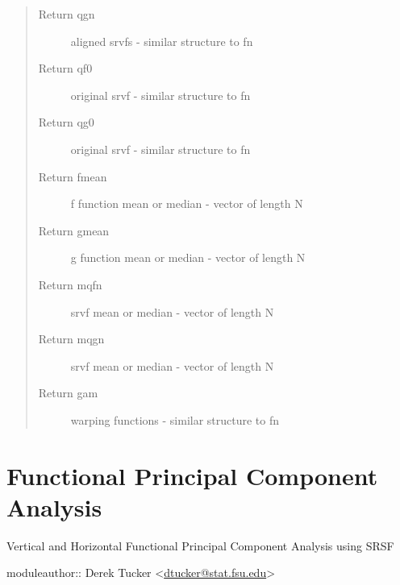 \documentclass[letterpaper,10pt,english]{sphinxmanual}
\begin{document}
\begin{fulllineitems}
\begin{quote}
\begin{description}
\item[{Return qgn}] \leavevmode
aligned srvfs - similar structure to fn

\item[{Return qf0}] \leavevmode
original srvf - similar structure to fn

\item[{Return qg0}] \leavevmode
original srvf - similar structure to fn

\item[{Return fmean}] \leavevmode
f function mean or median - vector of length N

\item[{Return gmean}] \leavevmode
g function mean or median - vector of length N

\item[{Return mqfn}] \leavevmode
srvf mean or median - vector of length N

\item[{Return mqgn}] \leavevmode
srvf mean or median - vector of length N

\item[{Return gam}] \leavevmode
warping functions - similar structure to fn

\end{description}\end{quote}

\end{fulllineitems}



\chapter{Functional Principal Component Analysis}
\label{fPCA:module-fPCA}\label{fPCA::doc}\label{fPCA:functional-principal-component-analysis}
Vertical and Horizontal Functional Principal Component Analysis using SRSF

moduleauthor:: Derek Tucker \textless{}\href{mailto:dtucker@stat.fsu.edu}{dtucker@stat.fsu.edu}\textgreater{}
\end{document}

